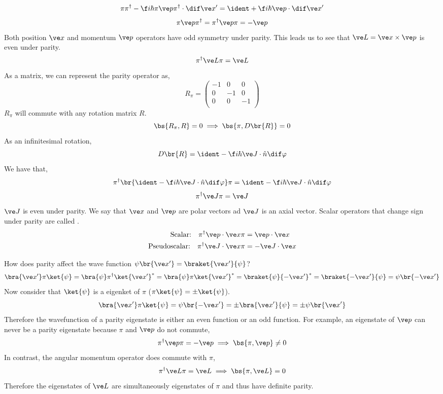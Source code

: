 \documentclass{article}
\begin{document}
\[  \pi \pi^{\dagger} - \f i \hbar \pi \ve p \pi^\dagger \cdot \dif \ve x' = \ident + \f i \hbar \ve p \cdot \dif \ve x'\]
\[ \pi \ve p \pi^{\dagger} = \pi^{\dagger} \ve p \pi = - \ve p \]
Both position $\ve x$ and momentum $\ve p$ operators have odd symmetry under parity. This leads us to see that $\ve L = \ve x \times \ve p$ is even under parity.
\[ \pi^{\dagger} \ve L \pi = \ve L \]
As a matrix, we can represent the parity operator as,
\[ R_{\pi} = \begin{pmatrix}
    -1 & 0 & 0 \\
    0 & -1 & 0 \\
    0 & 0 & -1 \\
\end{pmatrix}  \]
$R_{\pi}$ will commute with any rotation matrix $R$.
\[ \bs{R_{\pi}, R} = 0 \implies \bs{\pi, D\br{R}} = 0 \]
As an infinitesimal rotation,
\[ D\br{R} = \ident - \f i \hbar \ve J \cdot \hat n \dif \varphi \]
We have that,
\[ \pi^{\dagger} \br{\ident - \f i \hbar \ve J \cdot \hat n \dif \varphi} \pi = \ident - \f i \hbar \ve J \cdot \hat n \dif \varphi \]
\[ \pi^\dagger \ve J \pi = \ve J \]
$\ve J$ is even under parity. We say that $\ve x$ and $\ve p$ are polar vectors ad $\ve J$ is an axial vector. Scalar operators that change sign under parity are called .
\begin{align*}
    \text{Scalar:} \quad \pi^\dagger \ve p \cdot \ve x \pi &= \ve p \cdot \ve x \\
    \text{Pseudoscalar:} \quad \pi^\dagger \ve J \cdot \ve x \pi &= -\ve J \cdot \ve x \\
\end{align*}

How does parity affect the wave function $\psi\br{\ve x'}= \braket{\ve x'}{\psi}$?
\[ \bra{\ve x'} \pi \ket{\psi} = \bra{\psi} \pi^\dagger \ket{\ve x'}^* = \bra{\psi} \pi \ket{\ve x'}^* = \braket{\psi}{-\ve x'}^* = \braket{-\ve x'}{\psi} = \psi\br{- \ve x'} \]
Now consider that $\ket{\psi}$ is a eigenket of $\pi$ ($\pi \ket{\psi} = \pm \ket{\psi}$).
\[ \bra{\ve x'} \pi \ket{\psi} = \psi\br{- \ve x'} = \pm \bra{\ve x'}{\psi} = \pm \psi\br{\ve x'} \]
Therefore the wavefunction of a parity eigenstate is either an even function or an odd function. For example, an eigenstate of $\ve p$ can never be a parity eigenstate because $\pi$ and $\ve p$ do not commute,
\[ \pi^\dagger \ve p \pi = - \ve p \implies \bs{\pi, \ve p} \neq 0 \]
In contrast, the angular momentum operator does commute with $\pi$,
\[ \pi^\dagger \ve L \pi = \ve L \implies \bs{\pi, \ve L} = 0\]
Therefore the eigenstates of $\ve L$ are simultaneously eigenstates of $\pi$ and thus have definite parity. \\
\end{document}
